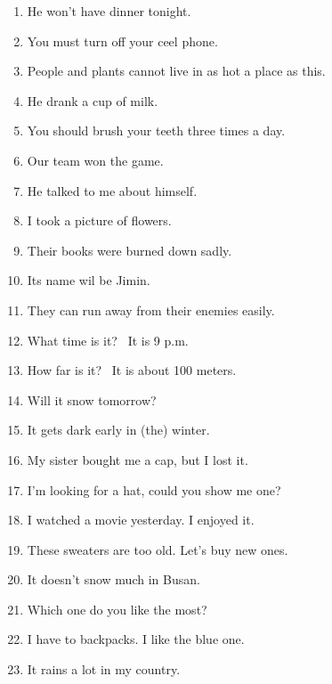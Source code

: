 \documentclass[9pt, a4paper,  landscape]{oblivoir}
\begin{document}
\begin{enumerate}
        \item He won't have dinner tonight. 
        \item You must turn off your ceel phone.
        \item People and plants cannot live in as hot a place as this. 
        \item He drank a cup of milk. 
        \item You should brush your teeth three times a day.
        \item Our team won the game. 
        \item He talked to me about himself. 
        \item I took a picture of flowers. 
        \item Their books were burned down sadly.
        \item Its name wil be Jimin. 
        \item They can run away from their enemies easily. 
        \item What time is it? \textendash~It is 9 p.m.
        \item How far is it? \textendash~It is about 100 meters. 
        \item Will it snow tomorrow? 
        \item It gets dark early in (the) winter.
        \item My sister bought me a cap, but I lost it. 
        \item I'm looking for a hat, could you show me one? 
        \item I watched a movie yesterday. I enjoyed it.
        \item These sweaters are too old. Let's buy new ones.
        \item It doesn't snow much in Busan. 
        \item Which one do you like the most? 
        \item I have to backpacks. I like the blue one. 
        \item It rains a lot in my country.
        
    \end{enumerate}
\end{document}
